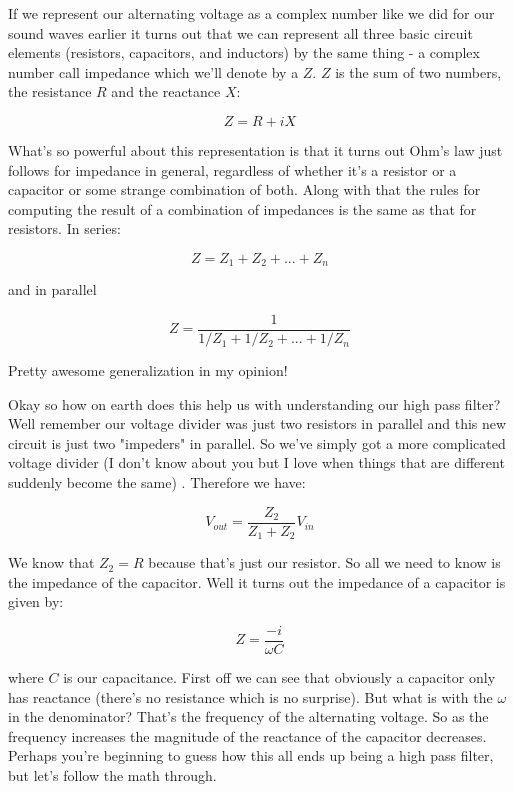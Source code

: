 \documentclass[10pt,a5paper]{book}
\begin{document}
If we represent our alternating voltage as a complex number like we did for our sound waves earlier it turns out that we can represent all three basic circuit elements (resistors, capacitors, and inductors) by the same thing - a complex number call impedance which we'll denote by a $Z$. $Z$ is the sum of two numbers, the resistance $R$ and the reactance $X$:

\begin{equation}
Z=R+iX
\end{equation}

What's so powerful about this representation is that it turns out Ohm's law just follows for impedance in general, regardless of whether it's a resistor or a capacitor or some strange combination of both. Along with that the rules for computing the result of a combination of impedances is the same as that for resistors. In series:

\begin{equation}
Z = Z_1 + Z_2 + ... + Z_n
\end{equation}

and in parallel

\begin{equation}
Z=\frac{1}{1/Z_1+1/Z_2 + ... + 1/Z_n}
\end{equation}

Pretty awesome generalization in my opinion! 

Okay so how on earth does this help us with understanding our high pass filter? Well remember our voltage divider was just two resistors in parallel and this new circuit is just two "impeders" in parallel. So we've simply got a more complicated voltage divider (I don't know about you but I love when things that are different suddenly become the same) \cite{artofelectronics}. Therefore we have:

\begin{equation}
V_{out}=\frac{Z_2}{Z_1 + Z_2}V_{in}
\end{equation}

We know that $Z_2=R$ because that's just our resistor. So all we need to know is the impedance of the capacitor. Well it turns out the impedance of a capacitor is given by:

\begin{equation}
Z=\frac{-i}{\omega C}
\end{equation}

where $C$ is our capacitance. First off we can see that obviously a capacitor only has reactance (there's no resistance which is no surprise). But what is with the $\omega$ in the denominator? That's the frequency of the alternating voltage. So as the frequency increases the magnitude of the reactance of the capacitor decreases. Perhaps you're beginning to guess how this all ends up being a high pass filter, but let's follow the math through. 
\end{document}
